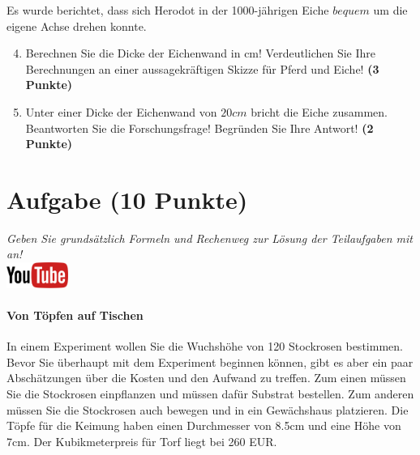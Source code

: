 \documentclass[a4paper, 9pt]{scrartcl}\usepackage[]{graphicx}\usepackage[]{xcolor}
\begin{document}
Es wurde berichtet, dass sich Herodot in der 1000-j{\"a}hrigen Eiche
$bequem$ um die eigene Achse drehen konnte.

\begin{enumerate}
  \setcounter{enumi}{3}
\item Berechnen Sie die Dicke der Eichenwand in cm! Verdeutlichen Sie Ihre
  Berechnungen an einer aussagekr{\"a}ftigen Skizze f{\"u}r Pferd und Eiche! \textbf{(3 Punkte)} 
\item Unter einer Dicke der Eichenwand von $20cm$ bricht
  die Eiche zusammen. Beantworten Sie die Forschungsfrage! Begr{\"u}nden Sie
  Ihre Antwort! \textbf{(2 Punkte)} 
\end{enumerate}
 
\clearpage

\section{Aufgabe \hfill (10 Punkte)}

\textit{Geben Sie grunds{\"a}tzlich Formeln und Rechenweg zur L{\"o}sung der
  Teilaufgaben mit an!} \\[1Ex]

\hfill\href{https://youtu.be/57B-yYoFSk0}{\includegraphics[width =
  2cm]{img/youtube}} %
\hspace{2Ex}

\paragraph{Von T{\"o}pfen auf Tischen}



In einem Experiment wollen Sie die Wuchsh{\"o}he von 120
Stockrosen bestimmen. Bevor Sie {\"u}berhaupt mit dem Experiment beginnen
k{\"o}nnen, gibt es aber ein paar Absch{\"a}tzungen {\"u}ber die Kosten und den Aufwand
zu treffen. Zum einen m{\"u}ssen Sie die Stockrosen einpflanzen und m{\"u}ssen
daf{\"u}r Substrat bestellen. Zum anderen m{\"u}ssen Sie die Stockrosen auch
bewegen und in ein Gew{\"a}chshaus platzieren. Die T{\"o}pfe f{\"u}r die Keimung haben
einen Durchmesser von 8.5cm und eine H{\"o}he von 7cm. Der
Kubikmeterpreis f{\"u}r Torf liegt bei 260 EUR.
\end{document}
